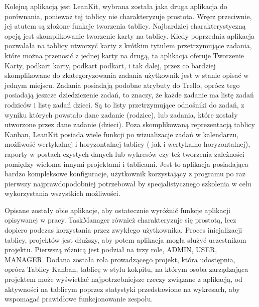 \indent  Kolejną aplikacją jest LeanKit, wybrana została jaka druga aplikacja do porównania, ponieważ tej tablicy nie charakteryzuje prostota. Wręcz przeciwnie, jej atutem są złożone funkcje tworzenia tablicy. Najbardziej charakterystyczną opcją jest skomplikowanie tworzenie karty na tablicy. Kiedy poprzednia aplikacja pozwalała  na tablicy utworzyć karty z krótkim tytułem przetrzymujące zadania, które można przenosić z jednej karty na drugą, ta aplikacja oferuje Tworzenie Karty, podkart karty, podkart podkart, i tak dalej, przez co bardziej skomplikowane do zkategoryzowania zadania użytkownik jest w stanie opisać w jednym miejscu. Zadania posiadają podobne atrybuty do Trello, oprócz tego posiadają jeszcze dziedziczenie zadań, to znaczy, że każde zadanie ma listę zadań rodziców i listę zadań dzieci. Są to listy przetrzymujące odnośniki do zadań, z wyniku których powstało dane zadanie (rodzice), lub zadania, które zostały utworzone przez dane zadanie (dzieci). 
Poza skomplikowaną reprezentacją tablicy Kanban, LeanKit posiada wiele funkcji po wizualizacje zadań w kalendarzu, możliwość wertykalnej i horyzontalnej tablicy ( jak i wertykalno horyzontalnej), raporty w postach czystych danych lub wykresów czy też tworzenia zależności pomiędzy wieloma innymi projektami i tablicami.
Jest to aplikacja posiadająca bardzo kompleksowe konfiguracje, użytkownik korzystający z programu po raz pierwszy najprawdopodobniej potrzebował by specjalistycznego szkolenia w celu wykorzystania wszystkich możliwości.


\indent Opisane zostały obie aplikacje, aby ostatecznie wyróżnić funkcje aplikacji opisywanej w pracy. TaskManager również charakteryzuje się prostotą, lecz dopiero podczas korzystania przez zwykłego użytkownika. Proces inicjalizacji tablicy, projektów jest dłuższy, aby potem aplikacja mogła służyć uczestnikom projektu.
Pierwszą różnicą jest podział na trzy role, ADMIN, USER, MANAGER. Dodana została rola prowadzącego projekt, która udostępnia, oprócz Tablicy Kanban, tablicę w stylu kokpitu, na którym osoba zarządzająca projektem może wyświetlać najpotrzebniejsze rzeczy związane z aplikacją, od aktywności na tablicym poprzez statystyki przedstawione na wykresach, aby wspomagać prawidłowe funkcjonowanie zespołu. 




